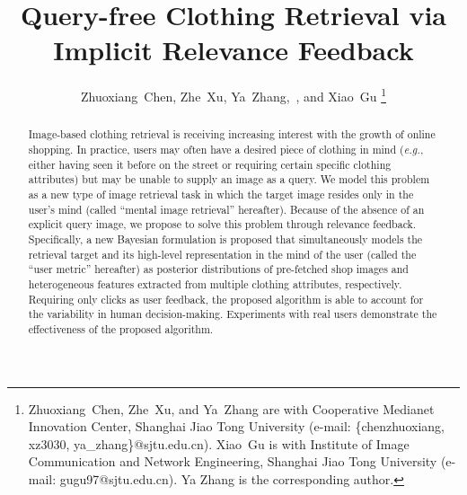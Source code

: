 \documentclass[journal]{IEEEtran}
\begin{document}
%

\title{Query-free Clothing Retrieval via Implicit Relevance Feedback}
%
\author{Zhuoxiang~Chen,
        Zhe~Xu,
        Ya~Zhang,~,
        and Xiao~Gu
\thanks{Zhuoxiang~Chen, Zhe~Xu, and Ya~Zhang are with Cooperative Medianet Innovation Center, Shanghai Jiao Tong University  (e-mail: \{chenzhuoxiang, xz3030, ya\_zhang\}@sjtu.edu.cn). Xiao~Gu is with Institute of Image Communication and Network Engineering, Shanghai Jiao Tong University  (e-mail: gugu97@sjtu.edu.cn). Ya Zhang is the corresponding author.}}




\maketitle

\begin{abstract}
Image-based clothing retrieval is receiving increasing interest with the growth of online shopping. In practice, users may often have a desired piece of clothing in mind (\textit{e.g.}, either having seen it before on the street or requiring certain specific clothing attributes) but may be unable to supply an image as a query. We model this problem as a new type of image retrieval task in which the target image resides only in the user's mind (called ``mental image retrieval'' hereafter). Because of the absence of an explicit query image, we propose to solve this problem through relevance feedback. Specifically, a new Bayesian formulation is proposed that simultaneously models the retrieval target and its high-level representation in the mind of the user (called the ``user metric'' hereafter) as posterior distributions of pre-fetched shop images and heterogeneous features extracted from multiple clothing attributes, respectively. Requiring only clicks as user feedback, the proposed algorithm is able to account for the variability in human decision-making. Experiments with real users demonstrate the effectiveness of the proposed algorithm.
\end{abstract}
\end{document}

